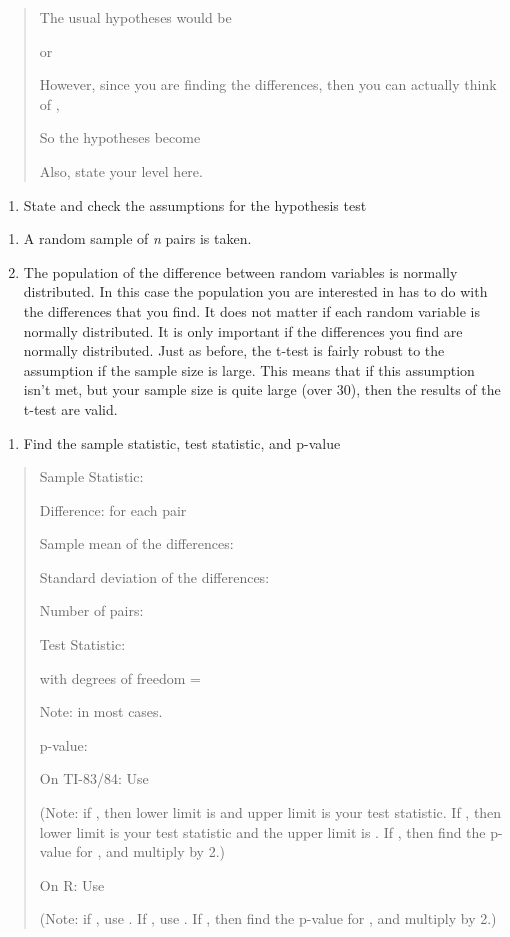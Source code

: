 \documentclass[]{book}
\providecommand{\tightlist}{%
  \setlength{\itemsep}{0pt}\setlength{\parskip}{0pt}}
\begin{document}
\begin{quote}
The usual hypotheses would be

or

However, since you are finding the differences, then you can actually
think of ,

So the hypotheses become

Also, state your level here.
\end{quote}

\begin{enumerate}
\def\labelenumi{\arabic{enumi}.}
\setcounter{enumi}{2}
\tightlist
\item
  State and check the assumptions for the hypothesis test
\end{enumerate}

\begin{enumerate}
\def\labelenumi{\alph{enumi}.}
\item
  A random sample of \emph{n} pairs is taken.
\item
  The population of the difference between random variables is normally distributed. In this case the population you are interested in has to do with the differences that you find. It does not matter if each random variable is normally distributed. It is only important if the differences you find are normally distributed. Just as before, the t-test is fairly robust to the assumption if the sample size is large. This means that if this assumption isn't met, but your sample size is quite large (over 30), then the results of the t-test are valid.
\end{enumerate}

\begin{enumerate}
\def\labelenumi{\arabic{enumi}.}
\setcounter{enumi}{3}
\tightlist
\item
  Find the sample statistic, test statistic, and p-value
\end{enumerate}

\begin{quote}
Sample Statistic:

Difference: for each pair

Sample mean of the differences:

Standard deviation of the differences:

Number of pairs:

Test Statistic:

with degrees of freedom =

Note: in most cases.

p-value:

On TI-83/84: Use

(Note: if , then lower limit is and upper limit is your test
statistic. If , then lower limit is your test statistic and the upper
limit is . If , then find the p-value for , and multiply by 2.)

On R: Use

(Note: if , use . If , use . If , then find the p-value for , and
multiply by 2.)
\end{quote}
\end{document}
